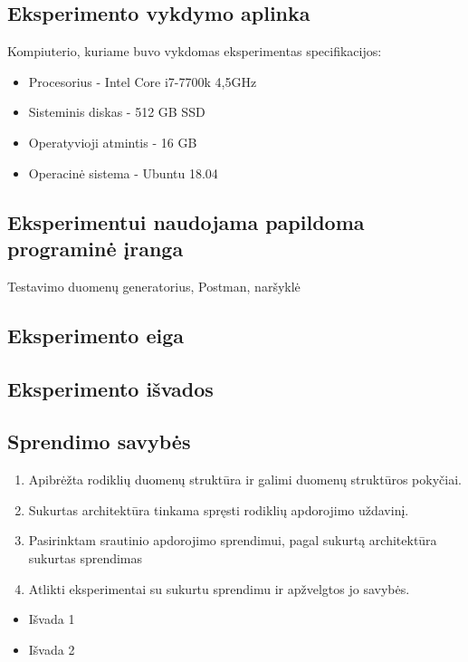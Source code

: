 \documentclass{VUMIFPSbakalaurinis}
\begin{document}
\subsection{Eksperimento vykdymo aplinka}

Kompiuterio, kuriame buvo vykdomas eksperimentas specifikacijos:
\begin{itemize}
    \item Procesorius - Intel Core i7-7700k 4,5GHz
    \item Sisteminis diskas -  512 GB SSD
    \item Operatyvioji atmintis - 16 GB 
    \item Operacinė sistema - Ubuntu 18.04
\end{itemize}

\subsection{Eksperimentui naudojama papildoma programinė įranga}

Testavimo duomenų generatorius, Postman, naršyklė

\subsection{Eksperimento eiga}

\subsection{Eksperimento išvados}

\subsection{Sprendimo savybės}


\begin{enumerate}
    \item Apibrėžta rodiklių duomenų struktūra ir galimi duomenų struktūros pokyčiai.
    \item Sukurtas architektūra tinkama spręsti rodiklių apdorojimo uždavinį. 
    \item Pasirinktam srautinio apdorojimo sprendimui, pagal sukurtą architektūra sukurtas sprendimas
    \item Atlikti eksperimentai su sukurtu sprendimu ir apžvelgtos jo savybės. 
\end{enumerate}

\begin{itemize}
    \item Išvada 1
    \item Išvada 2 
\end{itemize}

\printbibliography[heading=bibintoc] 


\end{document}
